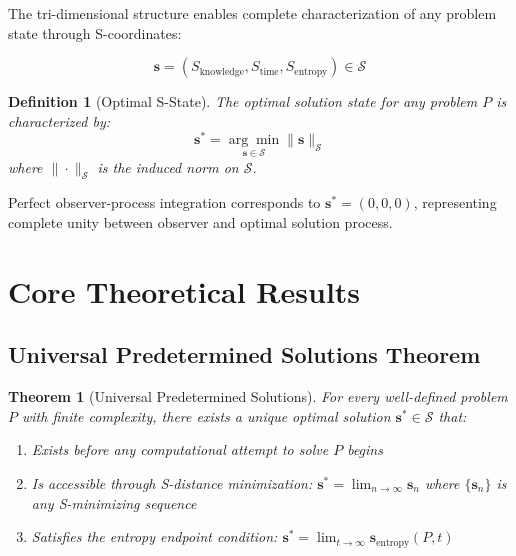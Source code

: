 \documentclass[11pt]{article}
\newtheorem{theorem}{Theorem}
\newtheorem{definition}{Definition}
\begin{document}
The tri-dimensional structure enables complete characterization of any problem state through S-coordinates:

\begin{equation}
\mathbf{s} = (S_{\text{knowledge}}, S_{\text{time}}, S_{\text{entropy}}) \in \mathcal{S}
\end{equation}

\begin{definition}[Optimal S-State]
The optimal solution state for any problem $P$ is characterized by:
\begin{equation}
\mathbf{s}^* = \underset{\mathbf{s} \in \mathcal{S}}{\arg\min} \|\mathbf{s}\|_{\mathcal{S}}
\end{equation}
where $\|\cdot\|_{\mathcal{S}}$ is the induced norm on $\mathcal{S}$.
\end{definition}

Perfect observer-process integration corresponds to $\mathbf{s}^* = (0, 0, 0)$, representing complete unity between observer and optimal solution process.

\section{Core Theoretical Results}

\subsection{Universal Predetermined Solutions Theorem}

\begin{theorem}[Universal Predetermined Solutions]
\label{thm:predetermined_solutions}
For every well-defined problem $P$ with finite complexity, there exists a unique optimal solution $\mathbf{s}^* \in \mathcal{S}$ that:
\begin{enumerate}
\item Exists before any computational attempt to solve $P$ begins
\item Is accessible through S-distance minimization: $\mathbf{s}^* = \lim_{n \to \infty} \mathbf{s}_n$ where $\{\mathbf{s}_n\}$ is any S-minimizing sequence
\item Satisfies the entropy endpoint condition: $\mathbf{s}^* = \lim_{t \to \infty} \mathbf{s}_{\text{entropy}}(P, t)$
\end{enumerate}
\end{theorem}
\end{document}

